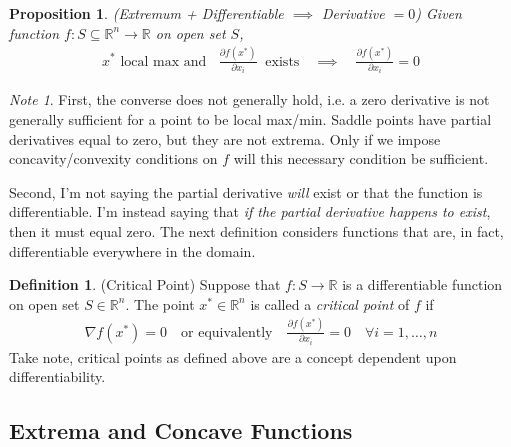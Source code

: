 \documentclass[12pt]{book}
\numberwithin{equation}{section} %
\theoremstyle{plain}
\newtheorem{prop}[thm]{Proposition}
\theoremstyle{definition}
\newtheorem{defn}[thm]{Definition}
\theoremstyle{remark}
\newtheorem*{note}{Note}
\newcommand{\R}{\mathbb{R}}
\newcommand{\Rn}{\mathbb{R}^n}
\begin{document}
\begin{prop}
\emph{(Extremum + Differentiable $\implies$ Derivative $=0$)}
Given function $f:S\subseteq \Rn\rightarrow \R$ on open set $S$,
\begin{align*}
  \text{$x^*$ local max and }\;\;
  \frac{\partial f(x^*)}{\partial x_i}
  \;\;\text{exists}
  \quad\implies\quad
  \frac{\partial f(x^*)}{\partial x_i} =0
\end{align*}
\end{prop}

\begin{note}
First, the converse does not generally hold, i.e. a zero derivative is
not generally sufficient for a point to be local max/min. Saddle points
have partial derivatives equal to zero, but  they are not extrema.
Only if we impose concavity/convexity conditions on $f$ will this
necessary condition be sufficient.

Second, I'm not saying the partial derivative \emph{will} exist or that
the function is differentiable. I'm instead saying that
\emph{if the partial derivative happens to exist}, then it must equal
zero.
The next definition considers functions that are, in
fact, differentiable everywhere in the domain.
\end{note}

\begin{defn}{(Critical Point)}
Suppose that $f:S\rightarrow\R$ is a differentiable function on open set
$S\in\Rn$. The point $x^*\in\Rn$ is called a \emph{critical
point} of $f$ if
\begin{align*}
  \nabla f(x^*) = 0
  \quad\text{or equivalently}\quad
  \frac{\partial f(x^*)}{\partial x_i} =0
  \quad\forall i=1,\ldots,n
\end{align*}
Take note, critical points as defined above are a concept dependent upon
differentiability.
\end{defn}

\subsection{Extrema and Concave Functions}
\label{sec:extrema-concave}
\end{document}

